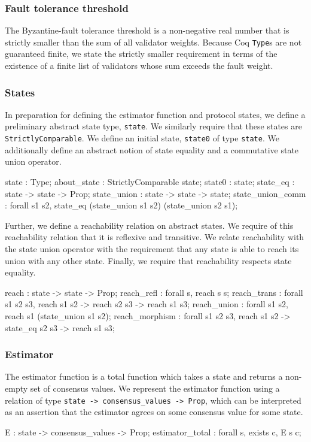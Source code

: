 \documentclass[runningheads]{llncs}
\begin{document}
\subsubsection{Fault tolerance threshold} 
The Byzantine-fault tolerance threshold is a non-negative real number that is strictly smaller than the sum of all validator weights. Because Coq \verb|Type|s are not guaranteed finite, we state the strictly smaller requirement in terms of the existence of a finite list of validators whose sum exceeds the fault weight. 

\subsubsection{States} 
In preparation for defining the estimator function and protocol states, we define a preliminary abstract state type, 
\verb|state|. We similarly require that these states are \verb|StrictlyComparable|. We define an initial state, \verb|state0| of type \verb|state|. We additionally define an abstract notion of state equality and a commutative state union operator. 
\begin{coq}
	state : Type;
	about_state : StrictlyComparable state;
	state0 : state;
	state_eq : state -> state -> Prop;
	state_union : state -> state -> state;
	state_union_comm : forall s1 s2, state_eq (state_union s1 s2) 
																						(state_union s2 s1);
\end{coq}
Further, we define a reachability relation on abstract states. We require of this reachability relation that it is reflexive and transitive. We relate reachability with the state union operator with the requirement that any state is able to reach its union with any other state. Finally, we require that reachability respects state equality. 
\begin{coq}
	reach : state -> state -> Prop;
	reach_refl : forall s, reach s s; 
	reach_trans : forall s1 s2 s3, reach s1 s2 -> reach s2 s3 -> reach s1 s3; 
	reach_union : forall s1 s2, reach s1 (state_union s1 s2);  
	reach_morphism : forall s1 s2 s3, reach s1 s2 -> state_eq s2 s3 -> reach s1 s3;  
\end{coq}

\subsubsection{Estimator} 
The estimator function is a total function which takes a state and returns a non-empty set of consensus values. We represent the estimator function using a relation of type \verb|state -> consensus_values -> Prop|, which can be interpreted as an assertion that the estimator agrees on some consensus value for some state. 
\begin{coq}
	E : state -> consensus_values -> Prop; 
	estimator_total : forall s, exists c, E s c; 
\end{coq}
\end{document}
